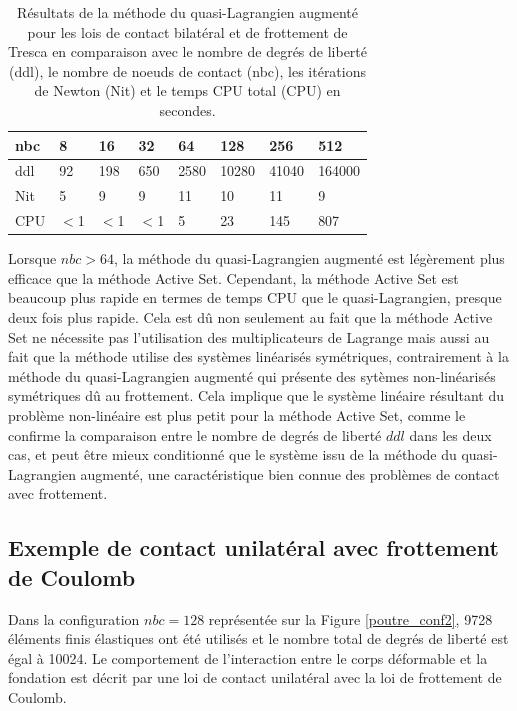 \begin{table}[htbp!]
\begin{tabular}{ |p{1.25cm}|p{1.25cm}|p{1.25cm}|p{1.25cm}|p{1.25cm}|p{1.25cm}|p{1.25cm}|p{1.25cm}| }
 \hline \rowcolor{lightgray}
			nbc & 8 & 16 & 32 & 64 & 128 & 256 & 512 \\
			\hline
			ddl & 92 & 198 & 650 & 2580 & 10280 & 41040 & 164000 \\
			Nit &  5 & 9 & 9 & 11 & 10 & 11 & 9 \\
			CPU &  $<$1 & $<$1 & $<$1 & 5 & 23 & 145 & 807  \\
\hline
\end{tabular}
\caption{Résultats de la méthode du quasi-Lagrangien augmenté pour les lois de contact bilatéral et         de frottement de Tresca
		     en comparaison avec le nombre de degrés de liberté (ddl), le nombre de noeuds de contact (nbc), les itérations de Newton (Nit) et le temps CPU total (CPU) en secondes.}\label{tab2_def}
\end{table}
Lorsque $ nbc>64$, la méthode du quasi-Lagrangien augmenté est légèrement plus efficace que la méthode Active Set. Cependant, la méthode Active Set est beaucoup plus rapide en termes de temps CPU que le quasi-Lagrangien, presque deux fois plus rapide. Cela est dû non seulement au fait que la méthode Active Set ne nécessite pas l'utilisation des multiplicateurs de Lagrange mais aussi au fait que la méthode utilise des systèmes linéarisés symétriques, contrairement à la méthode du quasi-Lagrangien augmenté qui présente des sytèmes non-linéarisés symétriques dû au frottement. Cela implique que le système linéaire résultant du problème non-linéaire est plus petit pour la méthode Active Set, comme le confirme la comparaison entre le nombre de degrés de liberté $ddl$ dans les deux cas, et peut être mieux conditionné que le système issu de la méthode du quasi-Lagrangien augmenté, une caractéristique bien connue des problèmes de contact avec frottement.


\subsection{Exemple de contact unilatéral avec frottement de Coulomb}
\label{substatcoulomb}
Dans la configuration $nbc=128$ représentée sur la Figure \ref{poutre_conf2}, 9728 éléments finis élastiques ont été utilisés et le nombre total de degrés de liberté est égal à 10024. Le comportement de l'interaction entre le corps déformable et la fondation est décrit par une loi de contact unilatéral avec la loi de frottement de Coulomb.

